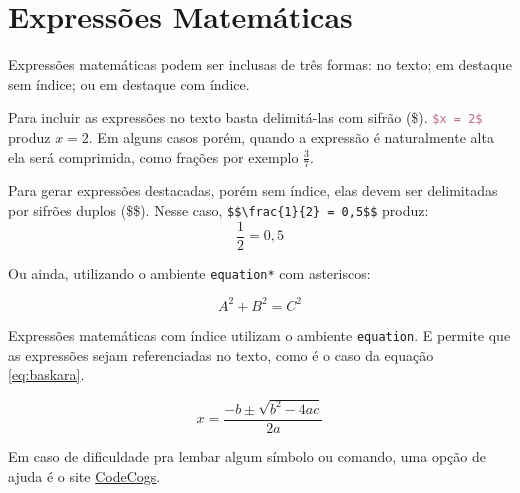 
\section{Expressões Matemáticas}
\label{sec:exmatematicas}

    Expressões matemáticas podem ser inclusas de três formas:
    no texto; em destaque sem índice; ou em destaque com índice.


    Para incluir as expressões no texto basta delimitá-las com sifrão (\$).
    \lstinline[language=TeX,style=code]|$x = 2$| produz $x = 2$.
    Em alguns casos porém, quando a expressão é naturalmente alta ela será comprimida, como frações por exemplo $\frac{3}{7}$.


    Para gerar expressões destacadas, porém sem índice, elas devem ser delimitadas por sifrões duplos (\$\$).
    Nesse caso, \lstinline[language=teX,style=code]|$$\frac{1}{2} = 0,5$$| produz:
    $$\frac{1}{2} = 0,5$$
    
    Ou ainda, utilizando o ambiente \lstinline[language=TeX,style=code]|equation*| com asteriscos:
    
    \begin{equation*}
        A^{2} + B^{2} = C^{2}
    \end{equation*}


    Expressões matemáticas com índice utilizam o ambiente \lstinline[language=TeX,style=code]|equation|.
    E permite que as expressões sejam referenciadas no texto, como é o caso da equação \ref{eq:baskara}.

    \begin{equation}
        x = \frac{-b \pm \sqrt{b^2 - 4ac}}{2a}
        \label{eq:baskara}
    \end{equation}

    Em caso de dificuldade pra lembar algum símbolo ou comando, uma opção de ajuda é o site \href{https://www.codecogs.com/latex/eqneditor.php}{CodeCogs}.

